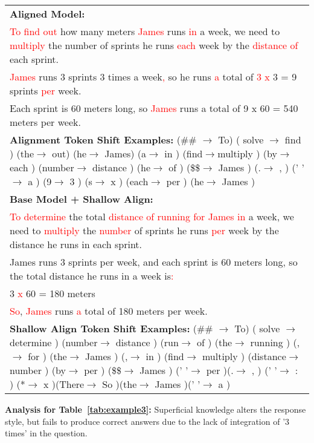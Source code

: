 \begin{table*}[h]
\begin{center}
\begin{tabular}{|p{14cm}|}
\midrule
\textbf{Aligned Model:} \\
\textcolor{red}{To find out} how many meters \textcolor{red}{James} runs \textcolor{red}{in} a week, we need to \textcolor{red}{multiply} the number of sprints he runs \textcolor{red}{each} week by the \textcolor{red}{distance of} each sprint. \\
\textcolor{red}{James} runs 3 sprints 3 times a week\textcolor{red}{,} so he runs \textcolor{red}{a} total of \textcolor{red}{3 x} 3 = 9 sprints \textcolor{red}{per} week.\\
Each sprint is 60 meters long, so \textcolor{red}{James} runs a total of 9 x 60 = 540 meters per week.\\
\midrule
\textbf{Alignment Token Shift Examples:} (\#\# $\rightarrow$ To)  ( solve $\rightarrow$ find )  (the$\rightarrow$ out) (he$\rightarrow$ James)  (a$\rightarrow$ in ) (find$\rightarrow$multiply ) (by$\rightarrow$ each ) (number$\rightarrow$ distance )  (he$\rightarrow$ of ) (\$\$$\rightarrow$ James ) (.$\rightarrow$ , ) (' '$\rightarrow$ a ) (9$\rightarrow$ 3 ) (s$\rightarrow$ x ) (each$\rightarrow$ per ) (he$\rightarrow$ James ) \\
\midrule
\textbf{Base Model + Shallow Align:}\\
\textcolor{red}{To determine} the total \textcolor{red}{distance of running for James in} a week, we need to \textcolor{red}{multiply} the \textcolor{red}{number} of sprints he runs \textcolor{red}{per} week by the distance he runs in each sprint. \\
James runs 3 sprints per week, and each sprint is 60 meters long, so the total distance he runs in a week is\textcolor{red}{:} \\
3 \textcolor{red}{x} 60 = 180 meters \\
\textcolor{red}{So}, \textcolor{red}{James} runs \textcolor{red}{a} total of 180 meters per week. \\

\midrule
\textbf{Shallow Align Token Shift Examples:} (\#\# $\rightarrow$ To)  ( solve $\rightarrow$ determine )  (number$\rightarrow$ distance ) (run$\rightarrow$ of ) (the$\rightarrow$ running ) (,$\rightarrow$ for ) (the$\rightarrow$ James ) (,$\rightarrow$ in ) (find$\rightarrow$ multiply ) (distance$\rightarrow$ number ) (by$\rightarrow$ per ) (\$\$$\rightarrow$ James )  (' '$\rightarrow$ per )(.$\rightarrow$ , ) (' '$\rightarrow$ : ) (*$\rightarrow$ x )(There$\rightarrow$ So )(the$\rightarrow$ James )(' '$\rightarrow$ a ) \\
\bottomrule
\end{tabular}

\end{center}
\caption{Examples of responses from the Base Model, Aligned Model, and Base Model with Superficial Knowledge (\textcolor{red}{Red} color shows the shift position).}
\label{tab:example3}
\end{table*}

\textbf{Analysis for Table~\ref{tab:example3}:} Superficial knowledge alters the response style, but fails to produce correct answers due to the lack of integration of '3 times' in the question.


